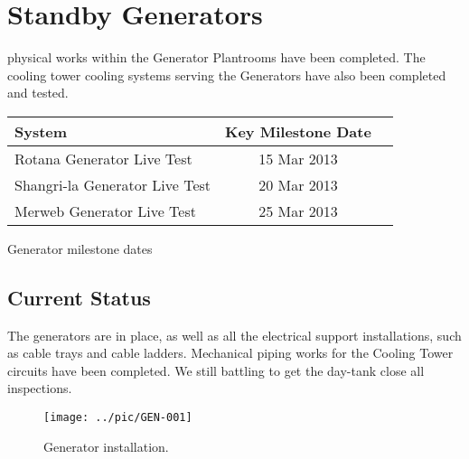 


\chapter{Standby Generators }
\label{generators}

 physical works within the Generator Plantrooms have been completed. The cooling tower cooling systems serving the Generators have also been completed and tested.

           \begin{margintable} 
	    \begin{tabular}{lcl}
	      \toprule
	      System    & Key Milestone Date  \\
	      \midrule
            Rotana Generator Live Test       &  15 Mar 2013  \\   
            Shangri-la Generator Live Test   & 20 Mar 2013\\
	       Merweb Generator Live Test       &  25 Mar 2013  \\
	      \bottomrule
	    \end{tabular}
           \caption{Generator milestone dates}
           \label{tbl:KEkeydates}
            \end{margintable}
 

\section{Current Status}

The generators are in place, as well as all the electrical support installations, such as cable trays and cable ladders. Mechanical piping works for the Cooling Tower circuits have been completed. We still
battling to get the day-tank close all inspections.


\begin{figure*}
  \texttt{[image: ../pic/GEN-001]}
  \caption{Generator installation.}
  \label{fig:generators}
\end{figure*}


